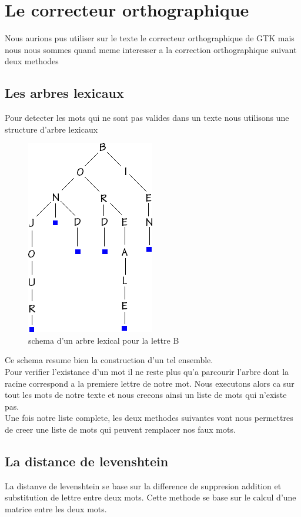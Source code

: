 \newpage

\section{Le correcteur orthographique}
Nous aurions pus utiliser sur le texte le correcteur orthographique de GTK mais nous nous sommes quand meme interesser a la correction orthographique suivant deux methodes 
\subsection{Les arbres lexicaux}
Pour detecter les mots qui ne sont pas valides dans un  texte nous utilisons une structure d'arbre lexicaux 
\begin{center}
	\begin{figure}[h]
		\includegraphics{arbre17.png}
		\caption{schema d'un arbre lexical pour la lettre B}
	\end{figure}
\end{center}
Ce schema resume bien la construction d'un tel ensemble.\\
Pour verifier l'existance d'un mot il ne reste plus qu'a parcourir l'arbre dont la racine correspond a la premiere lettre de notre mot.
Nous executons alors ca sur tout les mots de notre texte et nous creeons ainsi un liste de mots qui n'existe pas.\\
Une fois notre liste complete, les deux methodes suivantes vont nous permettres de creer une liste de mots qui peuvent remplacer nos faux mots.
\subsection{La distance de levenshtein}
La distanve de levenshtein se base sur la difference de suppresion addition et substitution de lettre entre deux mots. Cette methode se base sur le calcul d'une matrice entre les deux mots. 
